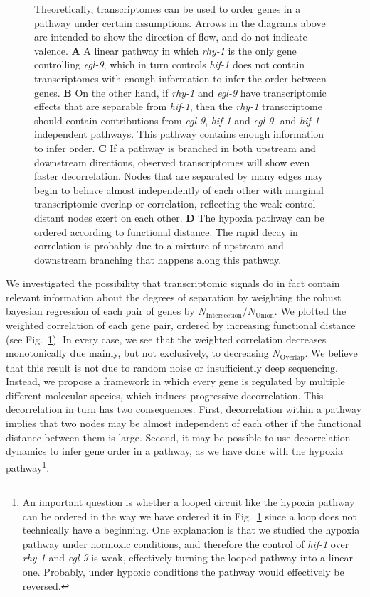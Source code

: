 \documentclass[9pt,twocolumn,twoside]{pnas-new}
\newcommand{\egl}{\emph{egl-9}}
\newcommand{\rhy}{\emph{rhy-1}}
\newcommand{\hif}{\emph{hif-1}}
\begin{document}
\begin{figure}[tbhp]
\caption{
Theoretically, transcriptomes can be used to order genes in a pathway under
certain assumptions. Arrows in the diagrams above are intended to show the
direction of flow, and do not indicate valence.
\textbf{A} A linear pathway in which \rhy{} is the only gene controlling \egl{},
which in turn controls \hif{} does not contain transcriptomes with enough
information to infer the order between genes.
\textbf{B} On the other hand, if \rhy{} and \egl{} have transcriptomic effects
that are separable from \hif{}, then the \rhy{} transcriptome should contain
contributions from \egl{}, \hif{} and \egl{}- and \hif{}-independent pathways.
This pathway contains enough information to infer order.
\textbf{C} If a pathway is branched in both upstream and downstream directions,
observed transcriptomes will show even faster decorrelation. Nodes that are
separated by many edges may begin to behave almost independently of each other
with marginal transcriptomic overlap or correlation, reflecting the weak control
distant nodes exert on each other.
\textbf{D} The hypoxia pathway can be ordered according to functional distance.
The rapid decay in correlation is probably due to a mixture of upstream and
downstream branching that happens along this pathway.
}
\label{fig:decorrelation}
\end{figure}

We investigated the possibility that transcriptomic signals do in fact contain
relevant information about the degrees of separation by weighting the robust
bayesian regression of each pair of genes by
$N_\mathrm{Intersection}/N_{\mathrm{Union}}$. We plotted the weighted
correlation of each gene pair, ordered by increasing functional distance
(see Fig.~\ref{fig:decorrelation}). In every case, we see that the weighted
correlation decreases monotonically due mainly, but not exclusively, to
decreasing $N_\mathrm{Overlap}$.
We believe that this result is not due to random noise or insufficiently deep
sequencing. Instead, we propose a framework in which every gene is regulated
by multiple different molecular species, which induces progressive decorrelation.
This decorrelation in turn has two consequences. First, decorrelation within a
pathway implies that two nodes may be almost independent of each other if the
functional distance between them is large. Second, it may be possible to use
decorrelation dynamics to infer gene order in a pathway, as we have done with
the hypoxia
pathway\footnote{
An important question is whether a looped circuit
like the hypoxia pathway can be ordered in the way we have ordered it in
Fig.~\ref{fig:decorrelation} since a loop does not technically have a beginning.
One explanation is that we studied the hypoxia pathway under normoxic conditions,
and therefore the control of \hif{} over \rhy{} and \egl{} is weak, effectively
turning the looped pathway into a linear one. Probably, under hypoxic conditions
the pathway would effectively be reversed.
}.
\end{document}
